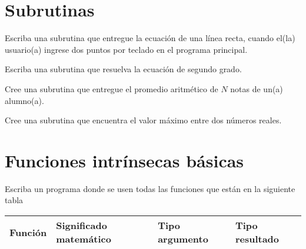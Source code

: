 \documentclass[11pt]{exam}
\begin{document}
\begin{questions}
\section{Subrutinas}
\item Escriba una subrutina que entregue la ecuaci\'on de una l\'inea recta, cuando el(la) usuario(a) ingrese dos puntos por teclado en el programa principal.
 \item Escriba una subrutina que resuelva la ecuaci\'on de segundo grado.
\item  Cree una subrutina que entregue el promedio aritm\'etico de $N$ notas de un(a) alumno(a).
\item Cree una subrutina que encuentra el valor m\'aximo entre dos n\'umeros reales.
%
\section{Funciones intr\'insecas b\'asicas}
 \item Escriba un programa donde se usen todas las funciones que est\'an en la siguiente tabla\\


\begin{tabular}{|p{2.5cm}|p{6.5cm}|p{3.5cm}|p{3.5cm}|}
\hline 
\textbf{Funci\'on} &         \textbf{Significado matem\'atico} &                 \textbf{Tipo argumento}& \textbf{Tipo resultado}\\ \hline 


\end{tabular}
\end{questions}
\end{document}
